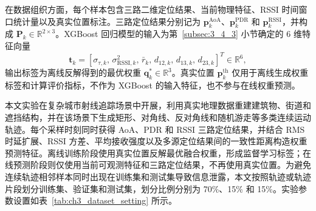 在数据组织方面，每个样本包含三路二维定位结果、当前物理特征、RSSI 时间窗口统计量以及真实位置标注。三路定位结果分别记为 \(\mathbf{p}_{k}^{\mathrm{AoA}}\)、\(\mathbf{p}_{k}^{\mathrm{PDR}}\) 和 \(\mathbf{p}_{k}^{\mathrm{RSSI}}\)，并构成 \(\mathbf{P}_k\in\mathbb{R}^{2\times3}\)。XGBoost 回归模型的输入为第~\ref{subsec:3_4_3} 小节确定的 6 维特征向量
\begin{equation}
\mathbf{t}_k
=
\left[
\sigma_{\tau,k},\,
\sigma^2_{\mathrm{RSSI},k},\,
\bar r_k,\,
d_{12,k},\,
d_{13,k},\,
d_{23,k}
\right]^T
\in\mathbb{R}^{6},
\label{eq:3_43_experiment_feature_vector}
\end{equation}
输出标签为离线反解得到的最优权重 \(\mathbf{q}_k^\ast\in\mathbb{R}^{3}\)。真实位置 \(\mathbf{p}_k^{\mathrm{th}}\) 仅用于离线生成权重标签和计算评价指标，不作为 XGBoost 的输入特征，也不参与在线权重预测。

本文实验在复杂城市射线追踪场景中开展，利用真实地理数据重建建筑物、街道和遮挡结构，并在该场景下生成矩形、对角线、反对角线和随机游走等多类连续运动轨迹。每个采样时刻同时获得 AoA、PDR 和 RSSI 三路定位结果，并结合 RMS 时延扩展、RSSI 方差、平均接收强度以及多源定位结果间的一致性距离构造权重预测特征。离线训练阶段使用真实位置反解最优融合权重，形成监督学习标签；在线预测阶段则仅使用当前可观测特征和三路定位结果，不再使用真实位置。为避免连续轨迹相邻样本同时出现在训练集和测试集导致信息泄露，本文按照轨迹或轨迹片段划分训练集、验证集和测试集，划分比例分别为 70\%、15\% 和 15\%。实验参数设置如表~\ref{tab:ch3_dataset_setting} 所示。

